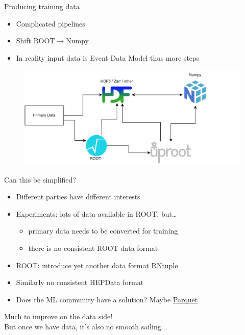 \documentclass[aspectratio=169,9pt]{beamer}
\begin{document}
\begin{frame}[t]{Producing training data}
  \begin{itemize}
    \item Complicated pipelines
    \item Shift ROOT$\rightarrow$Numpy
    \item In reality input data is Event Data Model thus more steps
  \end{itemize}
  \begin{figure}
    \centering
    \includegraphics[width=.7\textwidth]{making_dataset.drawio.pdf}
  \end{figure}
\end{frame}


\begin{frame}[t]{Can this be simplified?}
  \begin{itemize}
    \item Different parties have different interests
    \item Experiments: lots of data available in ROOT, but\ldots
    \begin{itemize}
      \item primary data needs to be converted for training
      \item there is no consistent ROOT data format
    \end{itemize}
    \item ROOT: introduce yet another data format \href{https://root.cern/doc/master/md_tree_ntuple_v7_doc_README.html}{\color{blue}RNtuple}
    \item Similarly no consistent HEPData format
    \item Does the ML community have a solution? Maybe \href{https://github.com/apache/parquet-format}{\color{blue}Parquet}
  \end{itemize}
  Much to improve on the data side!\\\vspace*{1cm}
  But once we have data, it's also no smooth sailing...
\end{frame}
\end{document}
